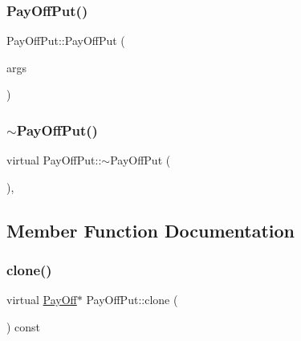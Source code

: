 \hypertarget{classPayOffPut_a16c35a5fdd65b105863853a90a58ec7d}{}\label{classPayOffPut_a16c35a5fdd65b105863853a90a58ec7d} 
\subsubsection{\texorpdfstring{Pay\+Off\+Put()}{PayOffPut()}\hspace{0.1cm}{\footnotesize\ttfamily [3/3]}}
{\footnotesize\ttfamily Pay\+Off\+Put\+::\+Pay\+Off\+Put (\begin{DoxyParamCaption}\item[{const \hyperlink{classMJArray}{M\+J\+Array} \&}]{args }\end{DoxyParamCaption})}

\hypertarget{classPayOffPut_abe98c70df681b36063f59671fc2877f6}{}\label{classPayOffPut_abe98c70df681b36063f59671fc2877f6} 
\subsubsection{\texorpdfstring{$\sim$\+Pay\+Off\+Put()}{~PayOffPut()}\hspace{0.1cm}{\footnotesize\ttfamily [2/2]}}
{\footnotesize\ttfamily virtual Pay\+Off\+Put\+::$\sim$\+Pay\+Off\+Put (\begin{DoxyParamCaption}{ }\end{DoxyParamCaption})\hspace{0.3cm}{\ttfamily [inline]}, {\ttfamily [virtual]}}



\subsection{Member Function Documentation}
\hypertarget{classPayOffPut_a95fe4c1716cf0f078967acdb31cf87e4}{}\label{classPayOffPut_a95fe4c1716cf0f078967acdb31cf87e4} 
\subsubsection{\texorpdfstring{clone()}{clone()}}
{\footnotesize\ttfamily virtual \hyperlink{classPayOff}{Pay\+Off}$\ast$ Pay\+Off\+Put\+::clone (\begin{DoxyParamCaption}{ }\end{DoxyParamCaption}) const\hspace{0.3cm}{\ttfamily [virtual]}}



